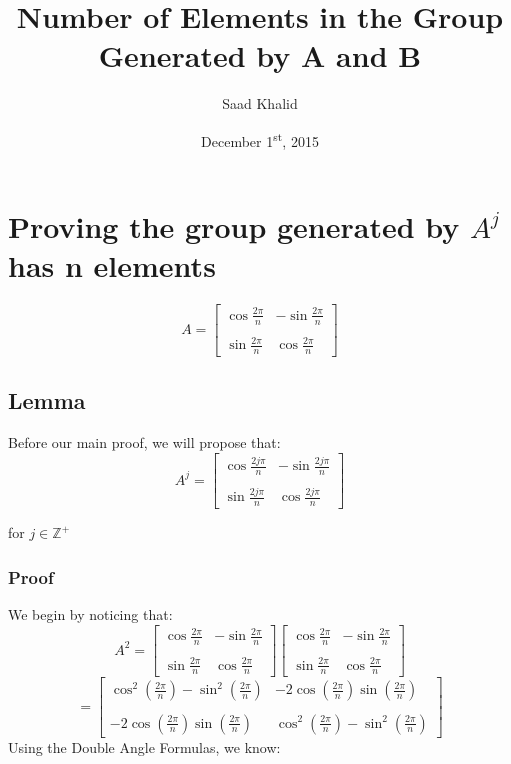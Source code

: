 \documentclass[12pt]{article}
\begin{document}
\title{Number of Elements in the Group Generated by A and B}
\author{Saad Khalid}
\date{December 1\textsuperscript{st}, 2015}

\maketitle

\section*{Proving the group generated by $A^j$ has n elements}

\[
	A = 
	\begin{bmatrix}
		\cos\frac{2\pi}{n} & -\sin\frac{2\pi}{n} \\
		\\
		\sin\frac{2\pi}{n} &  \cos\frac{2\pi}{n}
	\end{bmatrix}
\]
\subsection*{Lemma}

Before our main proof, we will propose that: \\

\[
	A^j = 
	\begin{bmatrix}
		\cos\frac{2j\pi}{n} & -\sin\frac{2j\pi}{n} \\
		\\
		\sin\frac{2j\pi}{n} &  \cos\frac{2j\pi}{n}
	\end{bmatrix}
\]

for $j\in\mathbb{Z}^{+}$
\\

\subsubsection*{Proof}

We begin by noticing that: \\
\[
	A^2 = 
	\begin{bmatrix}
		\cos\frac{2\pi}{n} & -\sin\frac{2\pi}{n} \\
		\\
		\sin\frac{2\pi}{n} &  \cos\frac{2\pi}{n}
	\end{bmatrix}
	\begin{bmatrix}
		\cos\frac{2\pi}{n} & -\sin\frac{2\pi}{n} \\
		\\
		\sin\frac{2\pi}{n} &  \cos\frac{2\pi}{n}
	\end{bmatrix}
\]
\[
	=
	\begin{bmatrix}
		\cos^2(\frac{2\pi}{n}) - \sin^2(\frac{2\pi}{n}) & -2\cos (\frac{2\pi}{n})\sin (\frac{2\pi}{n}) \\
		\\
		-2\cos (\frac{2\pi}{n}) \sin (\frac{2\pi}{n}) & \cos^2(\frac{2\pi}{n}) - \sin^2(\frac{2\pi}{n})  
	\end{bmatrix}
\]
Using the Double Angle Formulas, we know:
\end{document}
